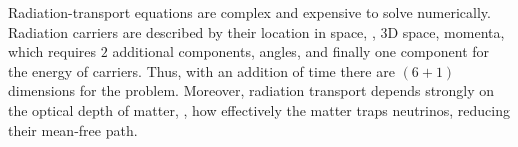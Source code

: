 Radiation-transport equations are complex and expensive to solve numerically. 
Radiation carriers are described by their location in space, \ie, $3$D space, 
momenta, which requires $2$ additional components, angles, and finally one 
component for the energy of carriers. 
%
Thus, with an addition of time there are $(6+1)$ dimensions for the problem. 
Moreover, radiation transport depends strongly on the optical depth of matter, 
\ie, how effectively the matter traps neutrinos, reducing their mean-free path.
%
%




